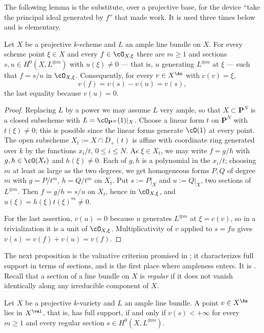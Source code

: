 The following lemma is the substitute, over a projective base, for the
device ``take the principal ideal generated by $f$'' that made
 work.  It is used three times below and is
elementary.

\begin{lemma}
\label{lem:ch32-sections-generate-local-ring}
Let $X$ be a projective $k$-scheme and $L$ an ample line bundle on
$X$.  For every scheme point $\xi\in X$ and every
$f\in\cO_{X,\xi}$ there are $m\geq1$ and sections
$s,u\in H^0(X,L^{\otimes m})$ with $u(\xi)\neq0$ --- that is, $u$
generating $L^{\otimes m}$ at $\xi$ --- such that $f=s/u$ in
$\cO_{X,\xi}$.  Consequently, for every $v\in X^{\An}$ with
$c(v)=\xi$,
\[
 v(f)=v(s)-v(u)=v(s),
\]
the last equality because $v(u)=0$.
\end{lemma}

\begin{proof}
Replacing $L$ by a power we may assume $L$ very ample, so that
$X\subset\mathbf P^N$ is a closed subscheme with
$L=\cO_{\mathbf P^N}(1)|_X$.  Choose a linear form $t$ on
$\mathbf P^N$ with $t(\xi)\neq0$; this is possible since the linear forms
generate $\cO(1)$ at every point.  The open subscheme
$X_t:=X\cap D_+(t)$ is affine with coordinate ring generated over $k$ by
the functions $x_i/t$, $0\leq i\leq N$.  As $\xi\in X_t$, we may write
$f=g/h$ with $g,h\in\cO(X_t)$ and $h(\xi)\neq0$.  Each of $g,h$ is a
polynomial in the $x_i/t$; choosing $m$ at least as large as the two
degrees, we get homogeneous forms $P,Q$ of degree $m$ with
$g=P/t^m$, $h=Q/t^m$ on $X_t$.  Put $s:=P|_X$ and $u:=Q|_X$, two
sections of $L^{\otimes m}$.  Then $f=g/h=s/u$ on $X_t$, hence in
$\cO_{X,\xi}$, and $u(\xi)=h(\xi)t(\xi)^m\neq0$.

For the last assertion, $v(u)=0$ because $u$ generates
$L^{\otimes m}$ at $\xi=c(v)$, so in a trivialization it is a unit of
$\cO_{X,\xi}$.  Multiplicativity of $v$ applied to $s=fu$ gives
$v(s)=v(f)+v(u)=v(f)$.
\end{proof}

The next proposition is the valuative criterion promised in
; it characterizes full support in terms of sections,
and is the first place where ampleness enters.  It is
\cite[Lemma~1.25]{BJ22}.  Recall that a section of a line bundle on $X$ is
\emph{regular} if it does not vanish identically along any irreducible
component of $X$.

\begin{proposition}
\label{prop:ch32-valuation-criterion}
Let $X$ be a projective $k$-variety and $L$ an ample line bundle.
A point $v\in X^{\An}$ lies in $X^{\val}$, that is, has full support, if
and only if $v(s)<+\infty$ for every $m\geq1$ and every regular section
$s\in H^0(X,L^{\otimes m})$.
\end{proposition}

